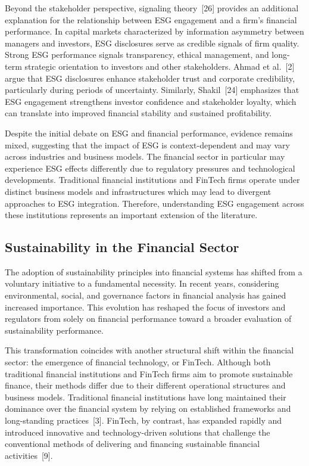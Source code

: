 \documentclass[12pt]{article}
\begin{document}
Beyond the stakeholder perspective, signaling theory~[26] provides an additional explanation for the relationship between ESG engagement and a firm's financial performance. In capital markets characterized by information asymmetry between managers and investors, ESG disclosures serve as credible signals of firm quality. Strong ESG performance signals transparency, ethical management, and long-term strategic orientation to investors and other stakeholders. Ahmad et al.~[2] argue that ESG disclosures enhance stakeholder trust and corporate credibility, particularly during periods of uncertainty. Similarly, Shakil~[24] emphasizes that ESG engagement strengthens investor confidence and stakeholder loyalty, which can translate into improved financial stability and sustained profitability.

Despite the initial debate on ESG and financial performance, evidence remains mixed, suggesting that the impact of ESG is context-dependent and may vary across industries and business models. The financial sector in particular may experience ESG effects differently due to regulatory pressures and technological developments. Traditional financial institutions and FinTech firms operate under distinct business models and infrastructures which may lead to divergent approaches to ESG integration. Therefore, understanding ESG engagement across these institutions represents an important extension of the literature.

\subsection{Sustainability in the Financial Sector}
The adoption of sustainability principles into financial systems has shifted from a voluntary initiative to a fundamental necessity. In recent years, considering environmental, social, and governance factors in financial analysis has gained increased importance. This evolution has reshaped the focus of investors and regulators from solely on financial performance toward a broader evaluation of sustainability performance.

This transformation coincides with another structural shift within the financial sector: the emergence of financial technology, or FinTech. Although both traditional financial institutions and FinTech firms aim to promote sustainable finance, their methods differ due to their different operational structures and business models. Traditional financial institutions have long maintained their dominance over the financial system by relying on established frameworks and long-standing practices~[3]. FinTech, by contrast, has expanded rapidly and introduced innovative and technology-driven solutions that challenge the conventional methods of delivering and financing sustainable financial activities~[9].
\end{document}

